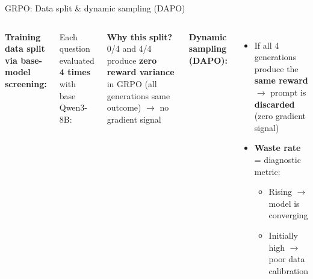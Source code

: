 \documentclass[aspectratio=169,10pt]{beamer}
\begin{document}
\begin{frame}{GRPO: Data split \& dynamic sampling (DAPO)}
\begin{columns}[T]
\textbf{Training data split via base-model screening:}
\vspace{0.3em}

Each question evaluated \textbf{4 times} with base Qwen3-8B:

\vspace{0.3em}
\centering
{} %

\vspace{0.3em}
\small \textbf{Why this split?} 0/4 and 4/4 produce \textbf{zero reward variance} in GRPO (all generations same outcome) $\to$ no gradient signal

\textbf{Dynamic sampling (DAPO):}

\vspace{0.3em}
\begin{itemize}\small
  \item If all 4 generations produce the \textbf{same reward} $\to$ prompt is \textbf{discarded} (zero gradient signal)
  \item \textbf{Waste rate} = diagnostic metric:
  \begin{itemize}\footnotesize
    \item Rising $\to$ model is converging
    \item Initially high $\to$ poor data calibration
  \end{itemize}
\end{itemize}


\end{columns}
\end{frame}
\end{document}
